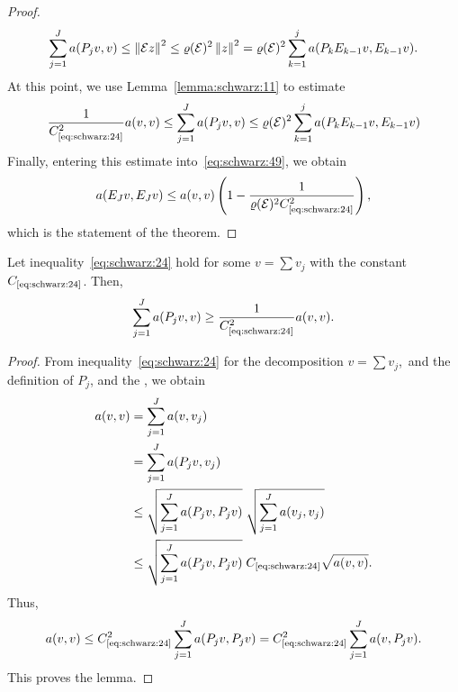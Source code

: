 \begin{proof}
  \begin{gather}
    \label{eq:schwarz:48}
    \sum_{j=1}^J a(P_j v,v) \le \left\|\mathcal E z\right\|^2
    \le \varrho(\mathcal E)^2 \left\|z\right\|^2
    = \varrho(\mathcal E)^2 \sum_{k=1}^{j} a(P_k E_{k-1} v,E_{k-1} v).
  \end{gather}
  At this point, we use Lemma~\ref{lemma:schwarz:11} to estimate
  \begin{gather*}
    \frac1{\constref{eq:schwarz:24}^2} a(v,v)
    \le \sum_{j=1}^J a(P_j v,v)
    \le \rho(\mathcal E)^2 \sum_{k=1}^{j} a(P_k E_{k-1} v,E_{k-1} v)
  \end{gather*}
  Finally, entering this estimate into~\eqref{eq:schwarz:49}, we
  obtain
  \begin{gather*}
    a(E_J v, E_J v)
    \le a(v,v) \left(1-\frac1{\rho(\mathcal
        E)^2\constref{eq:schwarz:24}^2}
      \right),
  \end{gather*}
  which is the statement of the theorem.
\end{proof}

\begin{lemma}
  \label{lemma:schwarz:11}
  Let inequality~\eqref{eq:schwarz:24} hold for some  $v=\sum v_j$ with the constant
  $\constref{eq:schwarz:24}$. Then,
  \begin{gather}
    \label{eq:schwarz:50}
    \sum_{j=1}^J a(P_j v,v) \ge \frac1{\constref{eq:schwarz:24}^2} a(v,v).
  \end{gather}
\end{lemma}

\begin{proof}
  From inequality~\eqref{eq:schwarz:24} for the decomposition $v=\sum
  v_j$,\ and the definition of $P_j$, and the
  , we obtain
  \begin{align*}
    a(v,v) &= \sum_{j=1}^J a(v,v_j) \\
    &= \sum_{j=1}^J a(P_j v, v_j) \\
    &\le \sqrt{\sum_{j=1}^J a(P_j v, P_j v)} \;\sqrt{\sum_{j=1}^J a(v_j,
      v_j)} \\
    & \le \sqrt{\sum_{j=1}^J a(P_j v, P_j v)}\;
    \constref{eq:schwarz:24} \sqrt{a(v,v)}.
  \end{align*}
  Thus,
  \begin{gather*}
    a(v,v) \le \constref{eq:schwarz:24}^2 \sum_{j=1}^J a(P_j v, P_j v)
    = \constref{eq:schwarz:24}^2 \sum_{j=1}^J a(v, P_j v).
  \end{gather*}
  This proves the lemma.
\end{proof}
